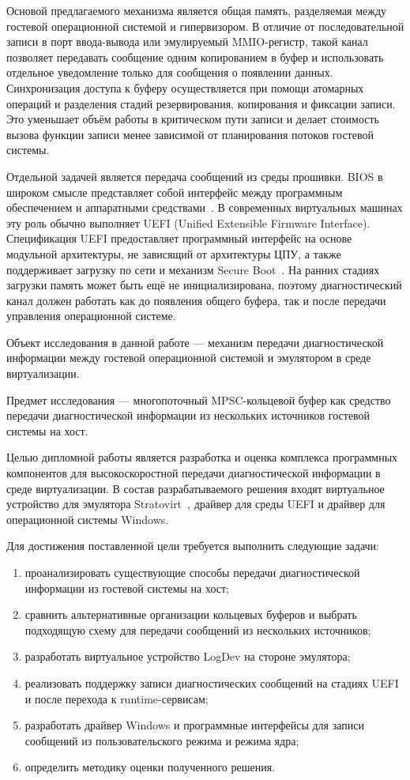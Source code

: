 Основой предлагаемого механизма является общая память, разделяемая между
гостевой операционной системой и гипервизором. В отличие от последовательной
записи в порт ввода-вывода или эмулируемый MMIO-регистр, такой канал позволяет
передавать сообщение одним копированием в буфер и использовать отдельное
уведомление только для сообщения о появлении данных. Синхронизация доступа к
буферу осуществляется при помощи атомарных операций и разделения стадий
резервирования, копирования и фиксации записи. Это уменьшает объём работы в
критическом пути записи и делает стоимость вызова функции записи менее
зависимой от планирования потоков гостевой системы.

Отдельной задачей является передача сообщений из среды прошивки. BIOS в широком
смысле представляет собой интерфейс между программным обеспечением и аппаратными
средствами~\cite{wong_bios}. В современных виртуальных машинах эту роль обычно
выполняет UEFI (Unified Extensible Firmware Interface). Спецификация UEFI
предоставляет программный интерфейс на основе модульной архитектуры, не
зависящий от архитектуры ЦПУ, а также поддерживает загрузку по сети и механизм
Secure Boot~\cite{kaspersky_uefi}. На ранних стадиях загрузки память может быть
ещё не инициализирована, поэтому диагностический канал должен работать как до
появления общего буфера, так и после передачи управления операционной системе.

Объект исследования в данной работе --- механизм передачи диагностической
информации между гостевой операционной системой и эмулятором в среде
виртуализации.

Предмет исследования --- многопоточный MPSC-кольцевой буфер как средство
передачи диагностической информации из нескольких источников гостевой системы
на хост.

Целью дипломной работы является разработка и оценка комплекса программных
компонентов для высокоскоростной передачи диагностической информации в среде
виртуализации. В состав разрабатываемого решения входят виртуальное устройство
для эмулятора Stratovirt~\cite{stratovirt_openeuler}, драйвер для среды UEFI и
драйвер для операционной системы Windows.

Для достижения поставленной цели требуется выполнить следующие задачи:
\begin{enumerate}
    \item проанализировать существующие способы передачи диагностической
    информации из гостевой системы на хост;
    \item сравнить альтернативные организации кольцевых буферов и выбрать
    подходящую схему для передачи сообщений из нескольких источников;
    \item разработать виртуальное устройство LogDev на стороне эмулятора;
    \item реализовать поддержку записи диагностических сообщений на стадиях UEFI
    и после перехода к runtime-сервисам;
    \item разработать драйвер Windows и программные интерфейсы для записи
    сообщений из пользовательского режима и режима ядра;
    \item определить методику оценки полученного решения.
\end{enumerate}

